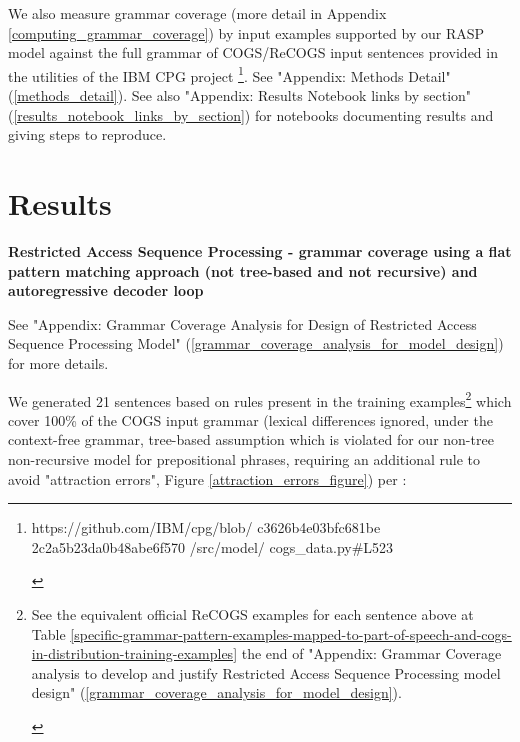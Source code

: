 \documentclass[11pt]{article}
\begin{document}
We also measure grammar coverage \cite{fuzzingbook2023:GrammarCoverageFuzzer} (more detail in Appendix \ref{computing_grammar_coverage}) by input examples supported by our RASP model against the full grammar of COGS/ReCOGS input sentences provided in the utilities of the IBM CPG project \cite{klinger2024compositionalprogramgenerationfewshot}\footnote{\begin{footnotesize}https://github.com/IBM/cpg/blob/
c3626b4e03bfc681be
2c2a5b23da0b48abe6f570
/src/model/
cogs\_data.py\#L523 
\end{footnotesize}
}. See "Appendix: Methods Detail" (\ref{methods_detail}). See also "Appendix: Results Notebook links by section" (\ref{results_notebook_links_by_section}) for notebooks documenting results and giving steps to reproduce.
\section{Results}
\textbf{Restricted Access Sequence Processing - grammar coverage using a flat pattern matching approach (not tree-based and not recursive) and autoregressive decoder loop}

See "Appendix: Grammar Coverage Analysis for Design of Restricted Access Sequence Processing Model" (\ref{grammar_coverage_analysis_for_model_design}) for more details.

We generated 21 sentences based on rules present in the training examples\footnote{\begin{footnotesize}See the equivalent official ReCOGS examples for each sentence above at Table \ref{specific-grammar-pattern-examples-mapped-to-part-of-speech-and-cogs-in-distribution-training-examples} the end of "Appendix: Grammar Coverage analysis to develop and justify Restricted Access Sequence Processing model design" (\ref{grammar_coverage_analysis_for_model_design}).
\end{footnotesize}} which cover 100\% of the COGS input grammar (lexical differences ignored, under the context-free grammar, tree-based assumption which is violated for our non-tree non-recursive model for prepositional phrases, requiring an additional rule to avoid "attraction errors", Figure \ref{attraction_errors_figure}) per \cite{fuzzingbook2023:GrammarCoverageFuzzer}:
\end{document}
